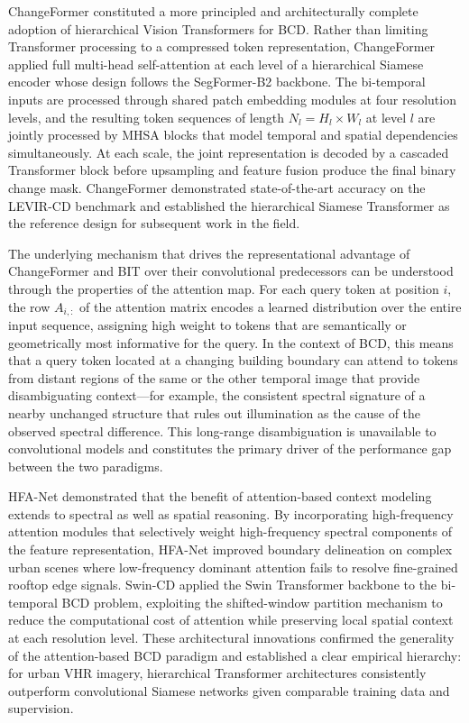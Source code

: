 ChangeFormer \cite{Bandara2022ChangeFormer} constituted a more principled and
architecturally complete adoption of hierarchical Vision Transformers for BCD.
Rather than limiting Transformer processing to a compressed token
representation, ChangeFormer applied full multi-head self-attention at each
level of a hierarchical Siamese encoder whose design follows the SegFormer-B2
backbone. The bi-temporal inputs are processed through shared patch embedding
modules at four resolution levels, and the resulting token sequences of length
$N_l = H_l \times W_l$ at level $l$ are jointly processed by MHSA blocks
that model temporal and spatial dependencies simultaneously. At each scale,
the joint representation is decoded by a cascaded Transformer block before
upsampling and feature fusion produce the final binary change mask.
ChangeFormer demonstrated state-of-the-art accuracy on the LEVIR-CD benchmark
and established the hierarchical Siamese Transformer as the reference design
for subsequent work in the field.

The underlying mechanism that drives the representational advantage of
ChangeFormer and BIT over their convolutional predecessors can be understood
through the properties of the attention map. For each query token at position
$i$, the row $A_{i,:}$ of the attention matrix encodes a learned distribution
over the entire input sequence, assigning high weight to tokens that are
semantically or geometrically most informative for the query. In the context
of BCD, this means that a query token located at a changing building boundary
can attend to tokens from distant regions of the same or the other temporal
image that provide disambiguating context---for example, the consistent
spectral signature of a nearby unchanged structure that rules out illumination
as the cause of the observed spectral difference. This long-range
disambiguation is unavailable to convolutional models and constitutes the
primary driver of the performance gap between the two paradigms.

HFA-Net \cite{Zheng2022HFANet} demonstrated that the benefit of
attention-based context modeling extends to spectral as well as spatial
reasoning. By incorporating high-frequency attention modules that selectively
weight high-frequency spectral components of the feature representation,
HFA-Net improved boundary delineation on complex urban scenes where
low-frequency dominant attention fails to resolve fine-grained rooftop edge
signals. Swin-CD \cite{Teng2023SwinCD} applied the Swin Transformer backbone
\cite{Liu2021Swin} to the bi-temporal BCD problem, exploiting the
shifted-window partition mechanism to reduce the computational cost of
attention while preserving local spatial context at each resolution level.
These architectural innovations confirmed the generality of the
attention-based BCD paradigm and established a clear empirical hierarchy:
for urban VHR imagery, hierarchical Transformer architectures consistently
outperform convolutional Siamese networks given comparable training data and
supervision.

